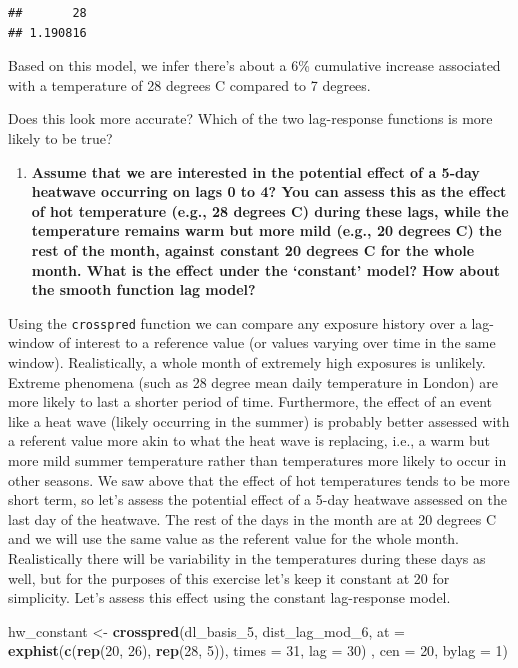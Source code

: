 \documentclass[
]{book}
\newenvironment{Shaded}{\begin{snugshade}}{\end{snugshade}}
\newcommand{\DataTypeTok}[1]{\textcolor[rgb]{0.13,0.29,0.53}{#1}}
\newcommand{\DecValTok}[1]{\textcolor[rgb]{0.00,0.00,0.81}{#1}}
\newcommand{\KeywordTok}[1]{\textcolor[rgb]{0.13,0.29,0.53}{\textbf{#1}}}
\newcommand{\NormalTok}[1]{#1}
\newcommand{\StringTok}[1]{\textcolor[rgb]{0.31,0.60,0.02}{#1}}
\providecommand{\tightlist}{%
  \setlength{\itemsep}{0pt}\setlength{\parskip}{0pt}}
\begin{document}
\begin{verbatim}
##       28 
## 1.190816
\end{verbatim}

Based on this model, we infer there's about a 6\% cumulative increase associated with a
temperature of 28 degrees C compared to 7 degrees.

Does this look more accurate? Which of the two lag-response functions is more likely to be true?

\begin{enumerate}
\def\labelenumi{\arabic{enumi}.}
\setcounter{enumi}{3}
\tightlist
\item
  \textbf{Assume that we are interested in the potential effect of a 5-day
  heatwave occurring on lags 0 to 4? You can assess this as the effect of hot temperature
  (e.g., 28 degrees C) during these lags, while the temperature remains warm but more
  mild (e.g., 20 degrees C) the rest of the month, against constant 20 degrees C for
  the whole month. What is the effect under the `constant' model? How about the smooth
  function lag model?}
\end{enumerate}

Using the \texttt{crosspred} function we can compare any exposure history over a lag-window of interest to a reference value (or values varying over time in the same window). Realistically, a whole month of extremely high exposures is unlikely. Extreme phenomena (such as 28 degree mean daily temperature in London) are more likely to last a shorter period of time. Furthermore, the effect of an event like a heat wave (likely occurring in the summer) is probably better assessed with a referent value more akin to what the heat wave is replacing, i.e., a warm but more mild summer temperature rather than temperatures more likely to occur in other seasons. We saw above that the effect of hot temperatures tends to be more short term, so let's assess the potential effect of a 5-day heatwave assessed on the last day of the heatwave. The rest of the days in the month are at 20 degrees C and we will use the same value as the referent value for the whole month. Realistically there will be variability in the temperatures during these days as well, but for the purposes of this exercise let's keep it constant at 20 for simplicity. Let's assess this effect using the constant lag-response model.

\begin{Shaded}
\begin{Highlighting}[]
\NormalTok{hw_constant <-}\StringTok{ }\KeywordTok{crosspred}\NormalTok{(dl_basis_}\DecValTok{5}\NormalTok{, dist_lag_mod_}\DecValTok{6}\NormalTok{, }
                         \DataTypeTok{at =} \KeywordTok{exphist}\NormalTok{(}\KeywordTok{c}\NormalTok{(}\KeywordTok{rep}\NormalTok{(}\DecValTok{20}\NormalTok{, }\DecValTok{26}\NormalTok{), }\KeywordTok{rep}\NormalTok{(}\DecValTok{28}\NormalTok{, }\DecValTok{5}\NormalTok{)), }\DataTypeTok{times =} \DecValTok{31}\NormalTok{, }\DataTypeTok{lag =} \DecValTok{30}\NormalTok{) , }
                         \DataTypeTok{cen =} \DecValTok{20}\NormalTok{, }\DataTypeTok{bylag =} \DecValTok{1}\NormalTok{)}
\end{Highlighting}
\end{Shaded}
\end{document}
